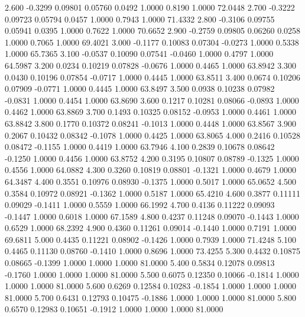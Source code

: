    2.600  -0.3299   0.09801   0.05760   0.0492   1.0000   0.8190   1.0000  72.0448
   2.700  -0.3222   0.09723   0.05794   0.0457   1.0000   0.7943   1.0000  71.4332
   2.800  -0.3106   0.09755   0.05941   0.0395   1.0000   0.7622   1.0000  70.6652
   2.900  -0.2759   0.09805   0.06260   0.0258   1.0000   0.7065   1.0000  69.4021
   3.000  -0.1177   0.10083   0.07304  -0.0273   1.0000   0.5338   1.0000  65.7365
   3.100  -0.0537   0.10090   0.07541  -0.0460   1.0000   0.4797   1.0000  64.5987
   3.200   0.0234   0.10219   0.07828  -0.0676   1.0000   0.4465   1.0000  63.8942
   3.300   0.0430   0.10196   0.07854  -0.0717   1.0000   0.4445   1.0000  63.8511
   3.400   0.0674   0.10206   0.07909  -0.0771   1.0000   0.4445   1.0000  63.8497
   3.500   0.0938   0.10238   0.07982  -0.0831   1.0000   0.4454   1.0000  63.8690
   3.600   0.1217   0.10281   0.08066  -0.0893   1.0000   0.4462   1.0000  63.8869
   3.700   0.1493   0.10325   0.08152  -0.0953   1.0000   0.4461   1.0000  63.8842
   3.800   0.1770   0.10372   0.08241  -0.1013   1.0000   0.4448   1.0000  63.8567
   3.900   0.2067   0.10432   0.08342  -0.1078   1.0000   0.4425   1.0000  63.8065
   4.000   0.2416   0.10528   0.08472  -0.1155   1.0000   0.4419   1.0000  63.7946
   4.100   0.2839   0.10678   0.08642  -0.1250   1.0000   0.4456   1.0000  63.8752
   4.200   0.3195   0.10807   0.08789  -0.1325   1.0000   0.4556   1.0000  64.0882
   4.300   0.3260   0.10819   0.08801  -0.1321   1.0000   0.4679   1.0000  64.3487
   4.400   0.3551   0.10976   0.08930  -0.1375   1.0000   0.5017   1.0000  65.0652
   4.500   0.3584   0.10972   0.08921  -0.1362   1.0000   0.5187   1.0000  65.4210
   4.600   0.3877   0.11111   0.09029  -0.1411   1.0000   0.5559   1.0000  66.1992
   4.700   0.4136   0.11222   0.09093  -0.1447   1.0000   0.6018   1.0000  67.1589
   4.800   0.4237   0.11248   0.09070  -0.1443   1.0000   0.6529   1.0000  68.2392
   4.900   0.4360   0.11261   0.09014  -0.1440   1.0000   0.7191   1.0000  69.6811
   5.000   0.4435   0.11221   0.08902  -0.1426   1.0000   0.7939   1.0000  71.4248
   5.100   0.4465   0.11130   0.08760  -0.1410   1.0000   0.8696   1.0000  73.4255
   5.300   0.4432   0.10875   0.08665  -0.1399   1.0000   1.0000   1.0000  81.0000
   5.400   0.5834   0.12078   0.09813  -0.1760   1.0000   1.0000   1.0000  81.0000
   5.500   0.6075   0.12350   0.10066  -0.1814   1.0000   1.0000   1.0000  81.0000
   5.600   0.6269   0.12584   0.10283  -0.1854   1.0000   1.0000   1.0000  81.0000
   5.700   0.6431   0.12793   0.10475  -0.1886   1.0000   1.0000   1.0000  81.0000
   5.800   0.6570   0.12983   0.10651  -0.1912   1.0000   1.0000   1.0000  81.0000
